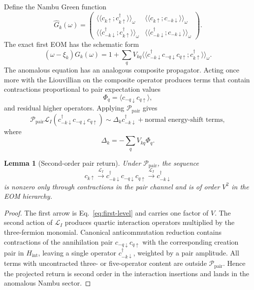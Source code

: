 \documentclass[aps,prb,reprint,superscriptaddress,nofootinbib]{revtex4-2}
\newtheorem{lemma}{Lemma}
\newcommand{\Liouv}{\mathcal{L}}
\newcommand{\Pc}{\mathcal{P}}
\begin{document}
Define the Nambu Green function
\begin{equation}
\hat{G}_k(\omega)
=
\begin{pmatrix}
\langle\langle c_{k\uparrow};c^\dagger_{k\uparrow}\rangle\rangle_\omega&
\langle\langle c_{k\uparrow};c_{-k\downarrow}\rangle\rangle_\omega\\
\langle\langle c^\dagger_{-k\downarrow};c^\dagger_{k\uparrow}\rangle\rangle_\omega&
\langle\langle c^\dagger_{-k\downarrow};c_{-k\downarrow}\rangle\rangle_\omega
\end{pmatrix}.
\end{equation}
The exact first EOM has the schematic form
\begin{equation}
(\omega-\xi_k)G_k(\omega)
=1+\sum_q V_{kq}
\langle\langle c^\dagger_{-k\downarrow}c_{-q\downarrow}c_{q\uparrow};
c^\dagger_{k\uparrow}\rangle\rangle_\omega .
\label{eq:normal-eom-composite}
\end{equation}
The anomalous equation has an analogous composite propagator. Acting once more with the Liouvillian on the composite operator produces terms that contain contractions proportional to pair expectation values
\begin{equation}
\Phi_q=\langle c_{-q\downarrow}c_{q\uparrow}\rangle,
\end{equation}
and residual higher operators. Applying \(\Pc_{\mathrm{pair}}\) gives
\begin{equation}
\Pc_{\mathrm{pair}}\Liouv_I
\left(c^\dagger_{-k\downarrow}c_{-q\downarrow}c_{q\uparrow}\right)
\sim
\Delta_k c^\dagger_{-k\downarrow}
+\text{normal energy-shift terms},
\end{equation}
where
\begin{equation}
\Delta_k=-\sum_q V_{kq}\Phi_q.
\label{eq:gap-definition}
\end{equation}

\begin{lemma}[Second-order pair return]
Under \(\Pc_{\mathrm{pair}}\), the sequence
\begin{equation}
c_{k\uparrow}
\xrightarrow{\Liouv_I}
c^\dagger_{-k\downarrow}c_{-q\downarrow}c_{q\uparrow}
\xrightarrow{\Liouv_I}
c^\dagger_{-k\downarrow}
\end{equation}
is nonzero only through contractions in the pair channel and is of order \(V^2\) in the EOM hierarchy.
\end{lemma}

\begin{proof}
The first arrow is Eq.~\eqref{eq:first-level} and carries one factor of \(V\). The second action of \(\Liouv_I\) produces quartic interaction operators multiplied by the three-fermion monomial. Canonical anticommutation reduction contains contractions of the annihilation pair \(c_{-q\downarrow}c_{q\uparrow}\) with the corresponding creation pair in \(H_{\mathrm{int}}\), leaving a single operator \(c^\dagger_{-k\downarrow}\), weighted by a pair amplitude. All terms with uncontracted three- or five-operator content are outside \(\Pc_{\mathrm{pair}}\). Hence the projected return is second order in the interaction insertions and lands in the anomalous Nambu sector.
\end{proof}
\end{document}
